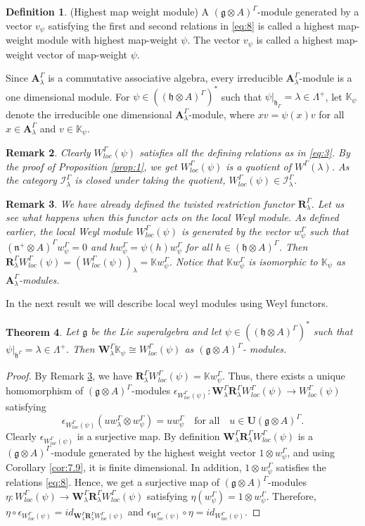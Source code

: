 \documentclass[11pt]{amsart}
\theoremstyle{plain}
\newtheorem{thm}{Theorem}[section]
\newtheorem{rem}[thm]{Remark}
\theoremstyle{definition}
\newtheorem{defn}[thm]{Definition}
\newcommand{\g}{\mathfrak{g}}
\newcommand{\h}{\mathfrak{h}}
\newcommand{\n}{\mathfrak{n}}
\newcommand{\A}{\mathbf{A}_{\lambda}^{\Gamma}}
\newcommand{\R}{\mathbf{R}_{\lambda}^{\Gamma}}
\newcommand{\lw}{w_{\psi}^{\Gamma}}
\newcommand{\LW}{W_{loc}^{\Gamma}(\psi)}
\begin{document}
\begin{defn}(Highest map weight module)
    A $(\g\otimes A)^{\Gamma}$-module generated by a vector $v_{\psi}$ satisfying the first and second relations in \eqref{eq:8} is called a highest map-weight module with highest map-weight $\psi$. The vector $v_{\psi}$ is called a highest map-weight vector of map-weight $\psi$. 
\end{defn}
Since $\A$ is a commutative associative algebra, every irreducible $\A$-module is a one dimensional module. For $\psi\in((\h\otimes A)^{\Gamma})^{*}$ such that $\psi|_{\h_{\Gamma}}=\lambda\in \Lambda^{+}$, let $\mathbb{K}_{\psi}$ denote the irreducible one dimensional $\A$-module, where $xv=\psi(x)v$ for all $x\in\A$ and $v\in\mathbb{K}_{\psi}$.
\begin{rem}
Clearly $W^{\Gamma}_{loc}(\psi)$ satisfies all the defining relations as in \eqref{eq:3}. By the proof of Proposition \ref{prop:1}, we get $\LW$ is a quotient of $W^{\Gamma}(\lambda)$. As the category $\mathcal{I}_{\lambda}^{\Gamma}$ is closed under taking the quotient, $\LW\in\mathcal{I}_{\lambda}^{\Gamma}$.
\end{rem}
\begin{rem}\label{rem8.3}
We have already defined the twisted restriction functor $\R$. Let us see what happens when this functor acts on the local Weyl module. As defined earlier, the local Weyl module $W_{loc}^{\Gamma}(\psi)$ is generated by the vector $\lw$ such that $(\n^{+}\otimes A)^{\Gamma}\lw=0$ and $h\lw=\psi(h)\lw$ for all $h\in(\h\otimes A)^{\Gamma}$. Then $\R\LW=(\LW)_{\lambda}=\mathbb{K}\lw$. Notice that $\mathbb{K}\lw$ is isomorphic to $\mathbb{K}_{\psi}$ as $\A$-modules.   
\end{rem}
\smallskip
In the next result we will describe local weyl modules using Weyl functors.
\begin{thm}\label{thm:8.4}
Let $\g$ be the Lie superalgebra and let $\psi\in((\h\otimes A)^{\Gamma})^{*}$ such that $\psi|_{\h^{\Gamma}}=\lambda\in\Lambda^{+}$. Then $\mathbf{W}_{\lambda}^{\Gamma}\mathbb{K}_{\psi}\cong\LW$ as $(\g \otimes A)^{\Gamma}$- modules.
\end{thm}
\begin{proof}
By Remark \ref{rem8.3}, we have $\R\LW=\mathbb{K}\lw$. Thus, there exists a unique homomorphism of $(\g\otimes A)^{\Gamma}$-modules $\epsilon_{\LW}:\mathbf{W}_{\lambda}^{\Gamma}\R\LW\rightarrow\LW$ satisfying
    \begin{equation*}
        \epsilon_{\LW}(uw_{\lambda}^{\Gamma}\otimes\lw)=u\lw \quad \mbox{for all}\quad u\in\mathbf{U}(\g\otimes A)^{\Gamma}.
    \end{equation*}
Clearly $\epsilon_{\LW}$ is a surjective map. By definition $\mathbf{W}_{\lambda}^{\Gamma}\R\LW$ is a 
$(\g\otimes A)^{\Gamma}$-module generated by the highest weight vector $1\otimes\lw$, and using Corollary \ref{cor:7.9}, it is finite dimensional. In addition, $1\otimes \lw$ satisfies the relations \eqref{eq:8}. Hence, we get a surjective map of $(\g\otimes A)^{\Gamma}$-modules $\eta:\LW\rightarrow \mathbf{W}_{\lambda}^{\Gamma}\R\LW$ satisfying $\eta(\lw)=1\otimes\lw$. Therefore, $\eta\circ\epsilon_{\LW}=id_{{\mathbf{W}_{\lambda}^{\Gamma}\R\LW}}$ and $\epsilon_{\LW}\circ\eta=id_{\LW}$.
\end{proof}
\end{document}
